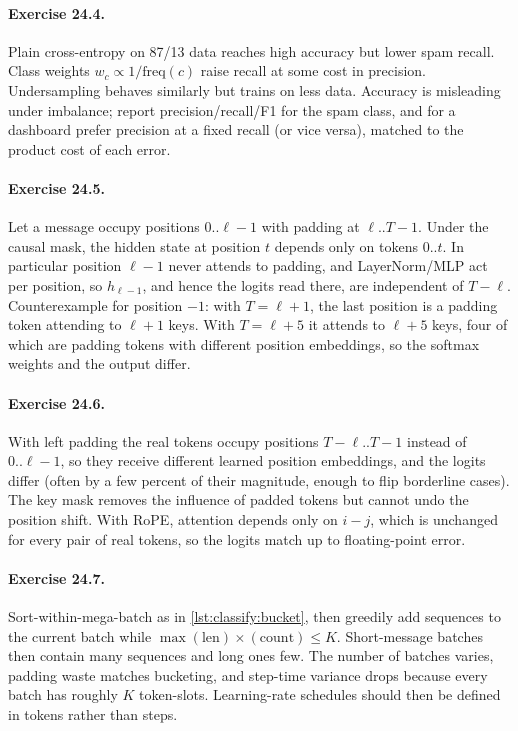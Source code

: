 \paragraph{Exercise 24.4.} Plain cross-entropy on 87/13 data reaches high accuracy but
lower spam recall. Class weights $w_c\propto 1/\text{freq}(c)$ raise recall at some cost
in precision. Undersampling behaves similarly but trains on less data. Accuracy is
misleading under imbalance; report precision/recall/F1 for the spam class, and for a
dashboard prefer precision at a fixed recall (or vice versa), matched to the product
cost of each error.

\paragraph{Exercise 24.5.} Let a message occupy positions $0..\ell-1$ with padding at
$\ell..T-1$. Under the causal mask, the hidden state at position $t$ depends only on
tokens $0..t$. In particular position $\ell-1$ never attends to padding, and
LayerNorm/MLP act per position, so $h_{\ell-1}$, and hence the logits read there, are
independent of $T-\ell$. Counterexample for position $-1$: with $T=\ell+1$, the last
position is a padding token attending to $\ell+1$ keys. With $T=\ell+5$ it attends to
$\ell+5$ keys, four of which are padding tokens with different position embeddings,
so the softmax weights and the output differ.

\paragraph{Exercise 24.6.} With left padding the real tokens occupy positions
$T-\ell..T-1$ instead of $0..\ell-1$, so they receive different learned position
embeddings, and the logits differ (often by a few percent of their magnitude, enough to
flip borderline cases). The key mask removes the influence of padded tokens but cannot
undo the position shift. With RoPE, attention depends only on $i-j$, which is unchanged
for every pair of real tokens, so the logits match up to floating-point error.

\paragraph{Exercise 24.7.} Sort-within-mega-batch as in \cref{lst:classify:bucket}, then
greedily add sequences to the current batch while $\max(\text{len})\times(\text{count})
\le K$. Short-message batches then contain many sequences and long ones few. The number
of batches varies, padding waste matches bucketing, and step-time variance drops
because every batch has roughly $K$ token-slots. Learning-rate schedules should then be
defined in tokens rather than steps.

